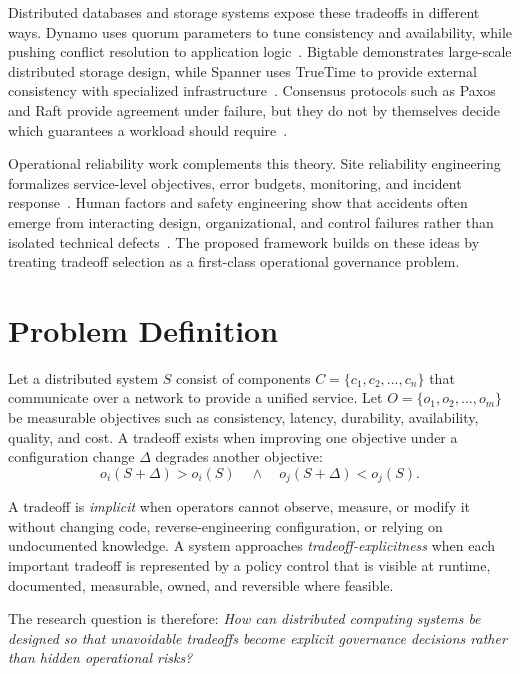 \documentclass[conference]{IEEEtran}
\begin{document}
Distributed databases and storage systems expose these tradeoffs in different ways. Dynamo uses quorum parameters to tune consistency and availability, while pushing conflict resolution to application logic~\cite{dynamo}. Bigtable demonstrates large-scale distributed storage design, while Spanner uses TrueTime to provide external consistency with specialized infrastructure~\cite{bigtable,spanner}. Consensus protocols such as Paxos and Raft provide agreement under failure, but they do not by themselves decide which guarantees a workload should require~\cite{lamport2001paxos,raft}.

Operational reliability work complements this theory. Site reliability engineering formalizes service-level objectives, error budgets, monitoring, and incident response~\cite{sre}. Human factors and safety engineering show that accidents often emerge from interacting design, organizational, and control failures rather than isolated technical defects~\cite{leveson,humanfactors}. The proposed framework builds on these ideas by treating tradeoff selection as a first-class operational governance problem.

\section{Problem Definition}

Let a distributed system $S$ consist of components $C=\{c_1,c_2,\ldots,c_n\}$ that communicate over a network to provide a unified service. Let $O=\{o_1,o_2,\ldots,o_m\}$ be measurable objectives such as consistency, latency, durability, availability, quality, and cost. A tradeoff exists when improving one objective under a configuration change $\Delta$ degrades another objective:
\begin{equation}
o_i(S+\Delta)>o_i(S) \quad \land \quad o_j(S+\Delta)<o_j(S).
\end{equation}

A tradeoff is \textit{implicit} when operators cannot observe, measure, or modify it without changing code, reverse-engineering configuration, or relying on undocumented knowledge. A system approaches \textit{tradeoff-explicitness} when each important tradeoff is represented by a policy control that is visible at runtime, documented, measurable, owned, and reversible where feasible.

The research question is therefore: \textit{How can distributed computing systems be designed so that unavoidable tradeoffs become explicit governance decisions rather than hidden operational risks?}
\end{document}
